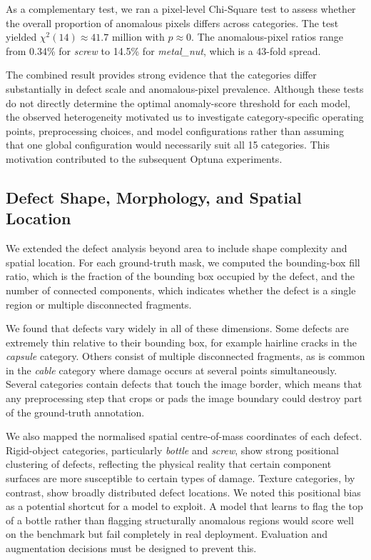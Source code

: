 \documentclass[11pt, a4paper]{article}
\begin{document}
As a complementary test, we ran a pixel-level Chi-Square test to assess whether the overall proportion of anomalous pixels differs across categories. The test yielded $\chi^2(14) \approx 41.7 \text{ million}$ with $p \approx 0$. The anomalous-pixel ratios range from 0.34\% for \textit{screw} to 14.5\% for \textit{metal\_nut}, which is a 43-fold spread.

The combined result provides strong evidence that the categories differ substantially in defect scale and anomalous-pixel prevalence. Although these tests do not directly determine the optimal anomaly-score threshold for each model, the observed heterogeneity motivated us to investigate category-specific operating points, preprocessing choices, and model configurations rather than assuming that one global configuration would necessarily suit all 15 categories. This motivation contributed to the subsequent Optuna experiments.

\subsection{Defect Shape, Morphology, and Spatial Location}
\label{sec:morphology}

We extended the defect analysis beyond area to include shape complexity and spatial location. For each ground-truth mask, we computed the bounding-box fill ratio, which is the fraction of the bounding box occupied by the defect, and the number of connected components, which indicates whether the defect is a single region or multiple disconnected fragments.

We found that defects vary widely in all of these dimensions. Some defects are extremely thin relative to their bounding box, for example hairline cracks in the \textit{capsule} category. Others consist of multiple disconnected fragments, as is common in the \textit{cable} category where damage occurs at several points simultaneously. Several categories contain defects that touch the image border, which means that any preprocessing step that crops or pads the image boundary could destroy part of the ground-truth annotation.

We also mapped the normalised spatial centre-of-mass coordinates of each defect. Rigid-object categories, particularly \textit{bottle} and \textit{screw}, show strong positional clustering of defects, reflecting the physical reality that certain component surfaces are more susceptible to certain types of damage. Texture categories, by contrast, show broadly distributed defect locations. We noted this positional bias as a potential shortcut for a model to exploit. A model that learns to flag the top of a bottle rather than flagging structurally anomalous regions would score well on the benchmark but fail completely in real deployment. Evaluation and augmentation decisions must be designed to prevent this.
\end{document}
